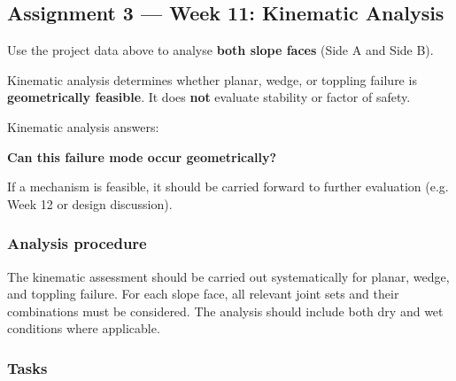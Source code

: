 \documentclass[a4paper,12pt]{article}
\begin{document}
\subsection{Assignment 3 --- Week 11: Kinematic Analysis}

Use the project data above to analyse \textbf{both slope faces} (Side A and Side B).

Kinematic analysis determines whether planar, wedge, or toppling failure is \textbf{geometrically feasible}. It does \textbf{not} evaluate stability or factor of safety.

\begin{notebox}
Kinematic analysis answers:
\vspace{1.0em}
\begin{center}
\textbf{Can this failure mode occur geometrically?}
\end{center}
\vspace{1.0em}
If a mechanism is feasible, it should be carried forward to further evaluation (e.g. Week 12 or design discussion).
\end{notebox}

\subsubsection{Analysis procedure}

The kinematic assessment should be carried out systematically for planar, wedge, and toppling failure. For each slope face, all relevant joint sets and their combinations must be considered. The analysis should include both dry and wet conditions where applicable.

\subsubsection{Tasks}
\end{document}
